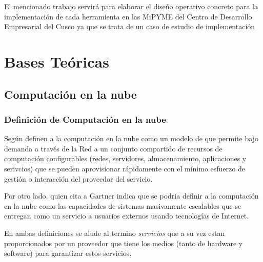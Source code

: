 El mencionado trabajo servirá para elaborar el diseño operativo concreto para la
implementación de cada herramienta en las MiPYME del Centro de Desarrollo
Empresarial del Cusco ya que se trata de un caso de estudio de implementación

\section{Bases Teóricas}

\subsection{Computación en la nube}

\subsubsection{Definición de Computación en la nube}
Según \cite{nist} definen a la computación en la nube como un modelo de
que permite bajo demanda a través de la Red a un conjunto compartido de recursos
de computación configurables (redes, servidores, almacenamiento, aplicaciones y serivcios)
que se pueden aprovisionar rápidamente con el mínimo esfuerzo de gestión o interacción
del proveedor del servicio.

Por otro lado, \cite{msolutions} quien cita a Gartner indica que se podría definir a la
computación en la nube como las capacidades de sistemas masivamente escalables que se entregan
como un servicio a usuarios externos usando tecnologías de Internet.

En ambas definiciones se alude al termino \emph{servicios} que a su vez estan proporcionados
por un proveedor que tiene los medios (tanto de hardware y software) para garantizar estos servicios.

